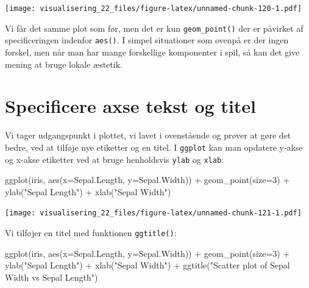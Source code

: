 \documentclass[
]{book}
\newenvironment{Shaded}{\begin{snugshade}}{\end{snugshade}}
\newcommand{\AttributeTok}[1]{\textcolor[rgb]{0.77,0.63,0.00}{#1}}
\newcommand{\DecValTok}[1]{\textcolor[rgb]{0.00,0.00,0.81}{#1}}
\newcommand{\FunctionTok}[1]{\textcolor[rgb]{0.00,0.00,0.00}{#1}}
\newcommand{\NormalTok}[1]{#1}
\newcommand{\SpecialCharTok}[1]{\textcolor[rgb]{0.00,0.00,0.00}{#1}}
\newcommand{\StringTok}[1]{\textcolor[rgb]{0.31,0.60,0.02}{#1}}
\begin{document}
\texttt{[image: visualisering\_22\_files/figure-latex/unnamed-chunk-120-1.pdf]}

Vi får det samme plot som før, men det er kun \texttt{geom\_point()} der er påvirket af specificeringen indenfor \texttt{aes()}. I simpel situationer som ovenpå er der ingen forskel, men når man har mange forskellige komponenter i spil, så kan det give mening at bruge lokale æstetik.

\hypertarget{specificere-axse-tekst-og-titel}{%
\section{Specificere axse tekst og titel}\label{specificere-axse-tekst-og-titel}}

Vi tager udgangspunkt i plottet, vi lavet i ovenstående og prøver at gøre det bedre, ved at tilføje nye etiketter og en titel. I \texttt{ggplot} kan man opdatere y-akse og x-akse etiketter ved at bruge henholdsvis \texttt{ylab} og \texttt{xlab}:

\begin{Shaded}
\begin{Highlighting}[]
\FunctionTok{ggplot}\NormalTok{(iris, }\FunctionTok{aes}\NormalTok{(}\AttributeTok{x=}\NormalTok{Sepal.Length, }\AttributeTok{y=}\NormalTok{Sepal.Width)) }\SpecialCharTok{+}
  \FunctionTok{geom\_point}\NormalTok{(}\AttributeTok{size=}\DecValTok{3}\NormalTok{) }\SpecialCharTok{+}
  \FunctionTok{ylab}\NormalTok{(}\StringTok{"Sepal Length"}\NormalTok{) }\SpecialCharTok{+}
  \FunctionTok{xlab}\NormalTok{(}\StringTok{"Sepal Width"}\NormalTok{)}
\end{Highlighting}
\end{Shaded}

\texttt{[image: visualisering\_22\_files/figure-latex/unnamed-chunk-121-1.pdf]}

Vi tilføjer en titel med funktionen \texttt{ggtitle()}:

\begin{Shaded}
\begin{Highlighting}[]
\FunctionTok{ggplot}\NormalTok{(iris, }\FunctionTok{aes}\NormalTok{(}\AttributeTok{x=}\NormalTok{Sepal.Length, }\AttributeTok{y=}\NormalTok{Sepal.Width)) }\SpecialCharTok{+}
  \FunctionTok{geom\_point}\NormalTok{(}\AttributeTok{size=}\DecValTok{3}\NormalTok{) }\SpecialCharTok{+}
  \FunctionTok{ylab}\NormalTok{(}\StringTok{"Sepal Length"}\NormalTok{) }\SpecialCharTok{+}
  \FunctionTok{xlab}\NormalTok{(}\StringTok{"Sepal Width"}\NormalTok{) }\SpecialCharTok{+}
  \FunctionTok{ggtitle}\NormalTok{(}\StringTok{"Scatter plot of Sepal Width vs Sepal Length"}\NormalTok{)}
\end{Highlighting}
\end{Shaded}
\end{document}
